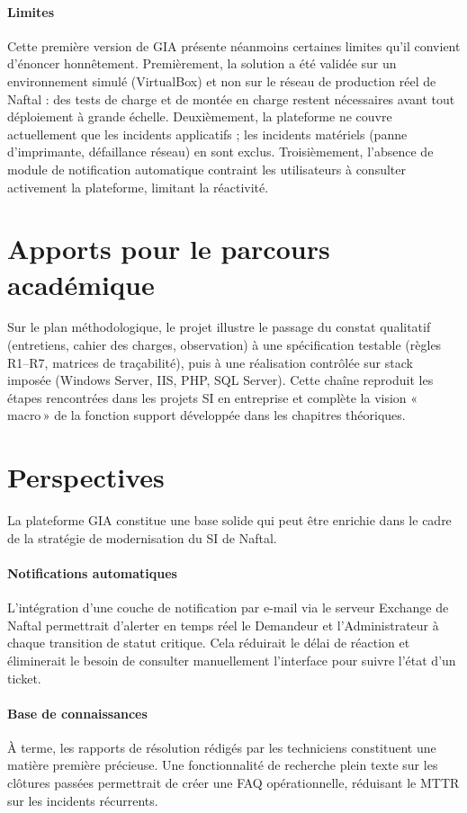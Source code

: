 \paragraph*{Limites} Cette première version de GIA présente néanmoins certaines limites qu'il
convient d'énoncer honnêtement. Premièrement, la solution a été validée sur un environnement
simulé (VirtualBox) et non sur le réseau de production réel de Naftal : des tests de charge et de
montée en charge restent nécessaires avant tout déploiement à grande échelle. Deuxièmement, la
plateforme ne couvre actuellement que les incidents applicatifs ; les incidents matériels (panne
d'imprimante, défaillance réseau) en sont exclus. Troisièmement, l'absence de module de
notification automatique contraint les utilisateurs à consulter activement la plateforme, limitant
la réactivité.

\section*{Apports pour le parcours académique}
Sur le plan méthodologique, le projet illustre le passage du constat qualitatif (entretiens,
cahier des charges, observation) à une spécification testable (règles R1--R7, matrices de
traçabilité), puis à une réalisation contrôlée sur stack imposée (Windows Server, IIS, PHP, SQL
Server). Cette chaîne reproduit les étapes rencontrées dans les projets SI en entreprise et
complète la vision «\,macro\,» de la fonction support développée dans les chapitres théoriques.

\section*{Perspectives}
La plateforme GIA constitue une base solide qui peut être enrichie dans le cadre de la stratégie
de modernisation du SI de Naftal.

\paragraph*{Notifications automatiques}
L'intégration d'une couche de notification par e-mail via le serveur Exchange de Naftal
permettrait d'alerter en temps réel le Demandeur et l'Administrateur à chaque transition de
statut critique. Cela réduirait le délai de réaction et éliminerait le besoin de consulter
manuellement l'interface pour suivre l'état d'un ticket.

\paragraph*{Base de connaissances}
À terme, les rapports de résolution rédigés par les techniciens constituent une matière première
précieuse. Une fonctionnalité de recherche plein texte sur les clôtures passées permettrait de
créer une FAQ opérationnelle, réduisant le MTTR sur les incidents récurrents.

